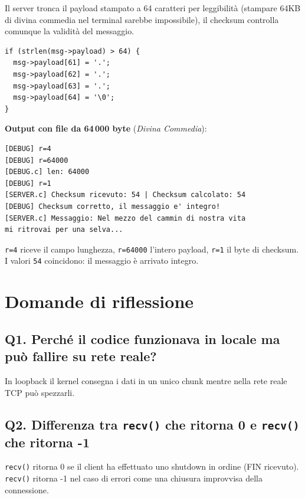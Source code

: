 \documentclass[a4paper,12pt]{article}
\begin{document}
Il server tronca il payload stampato a 64 caratteri per leggibilità
(stampare 64KB di divina commedia nel terminal sarebbe impossibile),
il checksum controlla comunque la validità del messaggio.

\begin{lstlisting}[caption={Troncamento output -- server}]
if (strlen(msg->payload) > 64) {
  msg->payload[61] = '.';
  msg->payload[62] = '.';
  msg->payload[63] = '.';
  msg->payload[64] = '\0';
}
\end{lstlisting}

\textbf{Output con file da 64\,000 byte} (\textit{Divina Commedia}):

\begin{lstlisting}[caption={Output -- checksum su 64 KB}, language={}]
[DEBUG] r=4
[DEBUG] r=64000
[DEBUG.c] len: 64000
[DEBUG] r=1
[SERVER.c] Checksum ricevuto: 54 | Checksum calcolato: 54
[DEBUG] Checksum corretto, il messaggio e' integro!
[SERVER.c] Messaggio: Nel mezzo del cammin di nostra vita
mi ritrovai per una selva...
\end{lstlisting}

\texttt{r=4} riceve il campo lunghezza, \texttt{r=64000} l'intero payload,
\texttt{r=1} il byte di checksum. I valori \texttt{54} coincidono: il messaggio
è arrivato integro.

\section{Domande di riflessione}

\subsection*{Q1. Perché il codice funzionava in locale ma può fallire su rete reale?}

In loopback il kernel consegna i dati in un unico chunk mentre nella rete reale TCP
può spezzarli.

\subsection*{Q2. Differenza tra \texttt{recv()} che ritorna 0 e \texttt{recv()} che ritorna -1}

\texttt{recv()} ritorna 0 se il client ha effettuato uno shutdown in ordine (FIN ricevuto).
\texttt{recv()} ritorna -1 nel caso di errori come una chiusura improvvisa della connessione.
\end{document}

